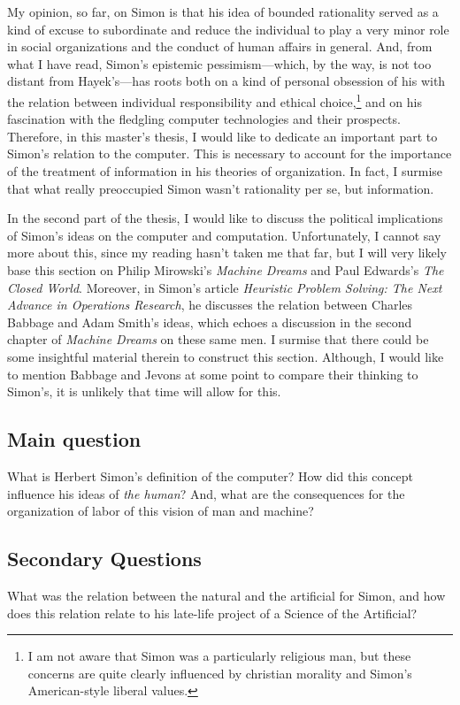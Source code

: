 \documentclass[paper=A4,portrait,twoside=true,twocolumn=true,headinclude=false,footinclude=false,fontsize=10,BCOR=15mm,DIV=13,pagesize=auto,titlepage=firstiscover,mpinclude=true,open=right,chapterprefix=true,numbers=autoendperiod,headsepline=false,parskip=false]{scrbook}
\theoremstyle{definition}
\begin{document}
My opinion, so far, on Simon is that his idea of bounded rationality served
as a kind of excuse to subordinate and reduce the individual to play a very
minor role in social organizations and the conduct of human affairs in
general. And, from what I have read, Simon's epistemic pessimism---which,
by the way, is not too distant from Hayek's---has roots both on a kind of
personal obsession of his with the relation between individual
responsibility and ethical choice,\footnote{I am not aware that Simon was a particularly religious man, but these
concerns are quite clearly influenced by christian morality and Simon's
American-style liberal values.} and on his fascination with the
fledgling computer technologies and their prospects. Therefore, in this
master's thesis, I would like to dedicate an important part to Simon's
relation to the computer. This is necessary to account for the importance
of the treatment of information in his theories of organization. In
fact, I surmise that what really preoccupied Simon wasn't 
rationality per se, but information.

In the second part of the thesis, I would like to discuss the political
implications of Simon's ideas on the computer and
computation. Unfortunately, I cannot say more about this, since my reading
hasn't taken me that far, but I will very likely base this section on
Philip Mirowski's \emph{Machine Dreams} and Paul Edwards's \emph{The Closed
World}. Moreover, in Simon's article \emph{Heuristic Problem Solving: The Next
Advance in Operations Research}, he discusses the relation between Charles
Babbage and Adam Smith's ideas, which echoes a discussion in the second
chapter of \emph{Machine Dreams} on these same men. I surmise that there could be
some insightful material therein to construct this section. Although, I
would like to mention Babbage and Jevons at some point to compare their
thinking to Simon's, it is unlikely that time will allow for this.
\subsection{Main question}
\label{sec:org2dbffb8}
What is Herbert Simon's definition of the computer? How did this concept
influence his ideas of \emph{the human}? And, what are the consequences for the
organization of labor of this vision of man and machine?
\subsection{Secondary Questions}
\label{sec:orgb1d6440}
What was the relation between the natural and the artificial for Simon, and
how does this relation relate to his late-life project of a Science of
the Artificial?
\end{document}
